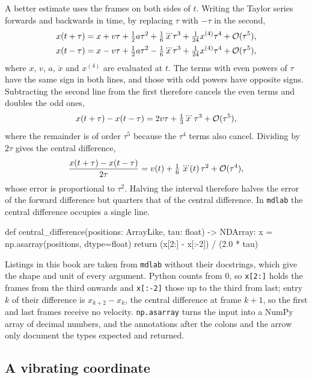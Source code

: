 A better estimate uses the frames on both sides of $t$. Writing the
Taylor series forwards and backwards in time, by replacing $\tau$ with
$-\tau$ in the second,
\begin{align*}
   x(t+\tau) &= x + v\tau + \tfrac12 a\tau^2 + \tfrac16\dddot{x}\tau^3
      + \tfrac1{24}x^{(4)}\tau^4 + \mathcal{O}(\tau^5),\\
   x(t-\tau) &= x - v\tau + \tfrac12 a\tau^2 - \tfrac16\dddot{x}\tau^3
      + \tfrac1{24}x^{(4)}\tau^4 + \mathcal{O}(\tau^5),
\end{align*}
where $x$, $v$, $a$, $\dddot{x}$ and $x^{(4)}$ are evaluated at $t$. The terms with
even powers of $\tau$ have the same sign in both lines, and those with odd
powers have opposite signs. Subtracting the second line from the first
therefore cancels the even terms and doubles the odd ones,
\begin{equation*}
   x(t+\tau) - x(t-\tau) = 2v\tau + \tfrac13\dddot{x}\,\tau^3
   + \mathcal{O}(\tau^5),
\end{equation*}
where the remainder is of order $\tau^5$ because the $\tau^4$ terms also
cancel. Dividing by $2\tau$ gives the central difference,
\begin{equation*}
   \frac{x(t+\tau) - x(t-\tau)}{2\tau} = v(t) + \tfrac16\,\dddot{x}(t)\,
   \tau^2 + \mathcal{O}(\tau^4),
\end{equation*}
whose error is proportional to $\tau^2$. Halving the interval therefore
halves the error of the forward difference but quarters that of the
central difference. In \texttt{mdlab} the central difference occupies a
single line.

\begin{code}
def central_difference(positions: ArrayLike, tau: float) -> NDArray:
    x = np.asarray(positions, dtype=float)
    return (x[2:] - x[:-2]) / (2.0 * tau)
\end{code}

Listings in this book are taken from \texttt{mdlab} without their
docstrings, which give the shape and unit of every argument. Python
counts from 0, so \texttt{x[2:]} holds the frames from the third onwards
and \texttt{x[:-2]} those up to the third from last; entry $k$ of their
difference is $x_{k+2} - x_k$, the central difference at frame $k + 1$,
so the first and last frames receive no velocity. \texttt{np.asarray}
turns the input into a NumPy array of decimal numbers, and the
annotations after the colons and the arrow only document the types
expected and returned.

\subsection*{A vibrating coordinate}


